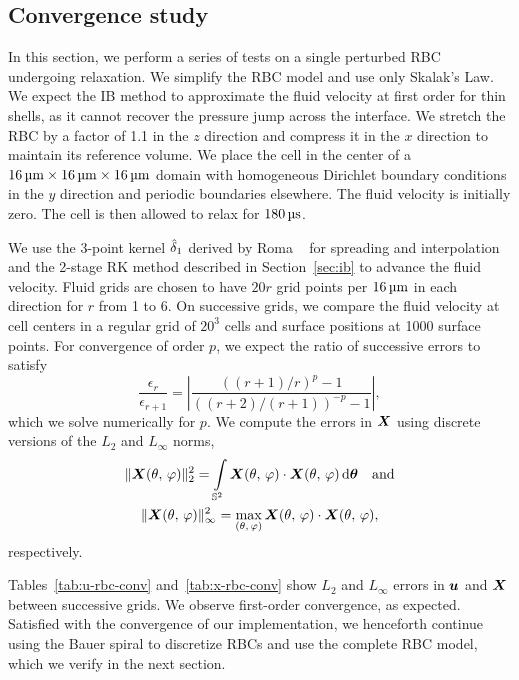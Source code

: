 \subsection{Convergence study}\label{sec:convergence}

In this section, we perform a series of tests on a single perturbed RBC undergoing
relaxation. We simplify the RBC model and use only Skalak's Law. We expect the IB method
to approximate the fluid velocity at first order for thin shells, as it cannot recover
the pressure jump across the interface. We stretch the RBC by a factor of 1.1 in the $z$
direction and compress it in the $x$ direction to maintain its reference volume. We place
the cell in the center of a $16\um\times16\um\times16\um$ domain with homogeneous
Dirichlet boundary conditions in the $y$ direction and periodic boundaries elsewhere. The
fluid velocity is initially zero. The cell is then allowed to relax for $180\us$.

We use the 3-point kernel $\hat{\delta}_1$ derived by Roma ~%
\cite{Roma:1999tx} for spreading and interpolation and the 2-stage RK method described in
Section~\ref{sec:ib} to advance the fluid velocity. Fluid grids are chosen to have $20r$
grid points per $16\um$ in each direction for $r$ from 1 to 6. On successive grids, we
compare the fluid velocity at cell centers in a regular grid of $20^3$ cells and surface
positions at 1000 surface points. For convergence of order $p$, we expect the ratio of
successive errors to satisfy
\begin{equation*}
    \frac{\epsilon_r}{\epsilon_{r+1}} = \left|\frac{((r+1)/r)^p-1}{((r+2)/(r+1))^{-p}-1}\right|,
\end{equation*}
which we solve numerically for $p$. We compute the errors in $\boldsymbol{X}$ using discrete versions
of the $L_2$ and $L_\infty$ norms,
\begin{gather}
    \|\X(\theta,\,\varphi)\|_2^2 =
    \int\limits_{\sphere} \X(\theta,\,\varphi)\cdot\X(\theta,\,\varphi) \d\qs \quad\text{and} \\
    \|\X(\theta,\,\varphi)\|_\infty^2 =
    \max_{(\theta,\,\varphi)} \X(\theta,\,\varphi)\cdot\X(\theta,\,\varphi),
\end{gather}
respectively.

Tables~\ref{tab:u-rbc-conv} and~\ref{tab:x-rbc-conv} show $L_2$ and $L_\infty$ errors in
$\boldsymbol{u}$ and $\boldsymbol{X}$ between successive grids. We observe first-order convergence, as expected.
Satisfied with the convergence of our implementation, we henceforth continue using the
Bauer spiral to discretize RBCs and use the complete RBC model, which we verify in the
next section.

